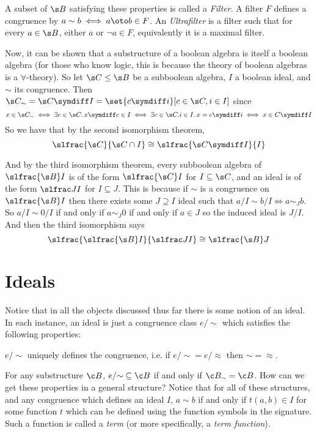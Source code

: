 A subset of $\s B$ satisfying these properties is called a {\it Filter}.
A filter $F$ defines a congruence by $a\sim b\iff a\oto b\in F$.
An {\it Ultrafilter} is a filter such that for every $a\in\s B$, either $a$ or $\neg a\in F$, equivalently it is a maximal filter.

Now, it can be shown that a substructure of a boolean algebra is itself a boolean algebra (for those who know logic, this is because the theory of boolean algebras is a $\forall$-theory).
So let $\s C\leq\s B$ be a subboolean algebra, $I$ a boolean ideal, and $\sim$ its congruence.
Then $\s C_\sim=\s C\symdiff I=\set{c\symdiff i}[c\in\s C,i\in I]$ since
$$ x\in\s C_\sim \iff \exists c\in\s C.\, x\symdiff c\in I \iff \exists c\in\s C.i\in I.\, x=c\symdiff i \iff x\in C\symdiff I $$
So we have that by the second isomorphism theorem,
$$ \slfrac{\s C}{\s C\cap I} \cong \slfrac{\s C\symdiff I}{I} $$

And by the third isomorphism theorem, every subboolean algebra of $\slfrac{\s B}I$ is of the form $\slfrac{\s C}I$ for $I\subseteq\s C$, and an ideal is of the form $\slfrac JI$ for $I\subseteq J$.
This is because if $\sim$ is a congruence on $\slfrac{\s B}I$ then there exists some $J\supseteq I$ ideal such that $a/I\sim b/I\iff a\sim_Jb$.
So $a/I\sim0/I$ if and only if $a\sim_J0$ if and only if $a\in J$ so the induced ideal is $J/I$.
And then the third isomorphism says
$$ \slfrac{\slfrac{\s B}I}{\slfrac JI} \cong \slfrac{\s B}J $$

\section{Ideals}

Notice that in all the objects discussed thus far there is some notion of an ideal.
In each instance, an ideal is just a congruence class $e/{\sim}$ which satisfies the following properties:
\benum
    \item $e/{\sim}$ uniquely defines the congruence, i.e. if $e/{\sim}=e/{\approx}$ then ${\sim}={\approx}$.
    \item For any substructure $\c B$, $e/{\sim}\subseteq\c B$ if and only if $\c B_\sim=\c B$.
\eenum
How can we get these properties in a general structure?
Notice that for all of these structures, and any congruence which defines an ideal $I$, $a\sim b$ if and only if $t(a,b)\in I$ for some function $t$ which can be defined using the function symbols in the
signature.
Such a function is called a {\it term} (or more specifically, a {\it term function}).

